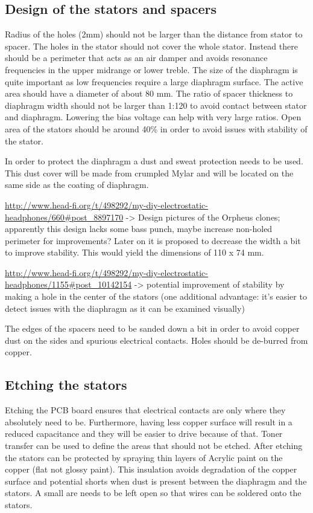 \documentclass{article}
\begin{document}
\subsection{Design of the stators and spacers}
\label{s:driver:design}
Radius of the holes (2mm) should not be larger than the distance from stator to spacer. The holes in the stator should not cover the whole stator. Instead there should be a perimeter that acts as an air damper and avoids resonance frequencies in the upper midrange or lower treble. The size of the diaphragm is quite important as low frequencies require a large diaphragm surface. The active area should have a diameter of about 80 mm. The ratio of spacer thickness to diaphragm width should not be larger than 1:120 to avoid contact between stator and diaphragm. Lowering the bias voltage can help with very large ratios. Open area of the stators should be around 40\% in order to avoid issues with stability of the stator.

In order to protect the diaphragm a dust and sweat protection needs to be used. This dust cover will be made from crumpled Mylar and will be located on the same side as the coating of diaphragm.

\url{http://www.head-fi.org/t/498292/my-diy-electrostatic-headphones/660#post_8897170} -> Design pictures of the Orpheus clones; apparently this design lacks some bass punch, maybe increase non-holed perimeter for improvements? Later on it is proposed to decrease the width a bit to improve stability. This would yield the dimensions of 110 x 74 mm.

\url{http://www.head-fi.org/t/498292/my-diy-electrostatic-headphones/1155#post_10142154} -> potential improvement of stability by making a hole in the center of the stators (one additional advantage: it's easier to detect issues with the diaphragm as it can be examined visually)

The edges of the spacers need to be sanded down a bit in order to avoid copper dust on the sides and spurious electrical contacts. Holes should be de-burred from copper.

\subsection{Etching the stators}
\label{s:driver:etching}
Etching the PCB board ensures that electrical contacts are only where they absolutely need to be. Furthermore, having less copper surface will result in a reduced capacitance and they will be easier to drive because of that. Toner transfer can be used to define the areas that should not be etched. After etching the stators can be protected by spraying thin layers of Acrylic paint on the copper (flat not glossy paint). This insulation avoids degradation of the copper surface and potential shorts when dust is present between the diaphragm and the stators. A small are needs to be left open so that wires can be soldered onto the stators.
\end{document}
